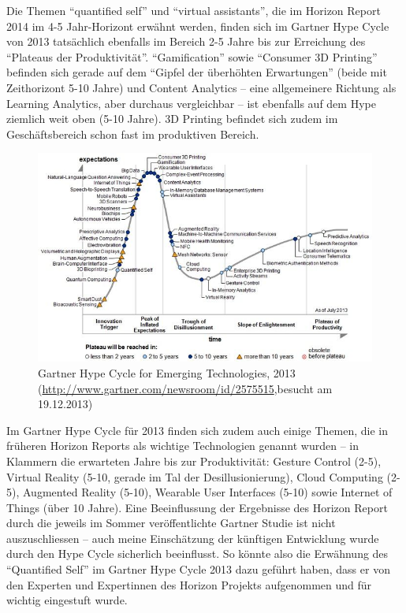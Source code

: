 \documentclass[a4paper,
fontsize=11pt,
oneside,
numbers=noperiodatend,
parskip=half-,
bibliography=totoc,
final
]{scrartcl}
\begin{document}
Die Themen \enquote{quantified self} und \enquote{virtual assistants},
die im Horizon Report 2014 im 4-5 Jahr-Horizont erwähnt werden, finden
sich im Gartner Hype Cycle von 2013 tatsächlich ebenfalls im Bereich 2-5
Jahre bis zur Erreichung des \enquote{Plateaus der Produktivität}.
\enquote{Gamification} sowie \enquote{Consumer 3D Printing} befinden
sich gerade auf dem \enquote{Gipfel der überhöhten Erwartungen} (beide
mit Zeithorizont 5-10 Jahre) und Content Analytics -- eine allgemeinere
Richtung als Learning Analytics, aber durchaus vergleichbar -- ist
ebenfalls auf dem Hype ziemlich weit oben (5-10 Jahre). 3D Printing
befindet sich zudem im Geschäftsbereich schon fast im produktiven
Bereich. ~

\begin{figure}[htbp]
\centering
\includegraphics{./img/04-hype-cycle-2013.jpg}
\caption{Gartner Hype Cycle for Emerging Technologies, 2013
(\url{http://www.gartner.com/newsroom/id/2575515},besucht am
19.12.2013)}
\end{figure}

Im Gartner Hype Cycle für 2013 finden sich zudem auch einige Themen, die
in früheren Horizon Reports als wichtige Technologien genannt wurden --
in Klammern die erwarteten Jahre bis zur Produktivität: Gesture Control
(2-5), Virtual Reality (5-10, gerade im Tal der Desillusionierung),
Cloud Computing (2-5), Augmented Reality (5-10), Wearable User
Interfaces (5-10) sowie Internet of Things (über 10 Jahre). Eine
Beeinflussung der Ergebnisse des Horizon Report durch die jeweils im
Sommer veröffentlichte Gartner Studie ist nicht auszuschliessen -- auch
meine Einschätzung der künftigen Entwicklung wurde durch den Hype Cycle
sicherlich beeinflusst. So könnte also die Erwähnung des
\enquote{Quantified Self} im Gartner Hype Cycle 2013 dazu geführt haben,
dass er von den Experten und Expertinnen des Horizon Projekts
aufgenommen und für wichtig eingestuft wurde.
\end{document}
